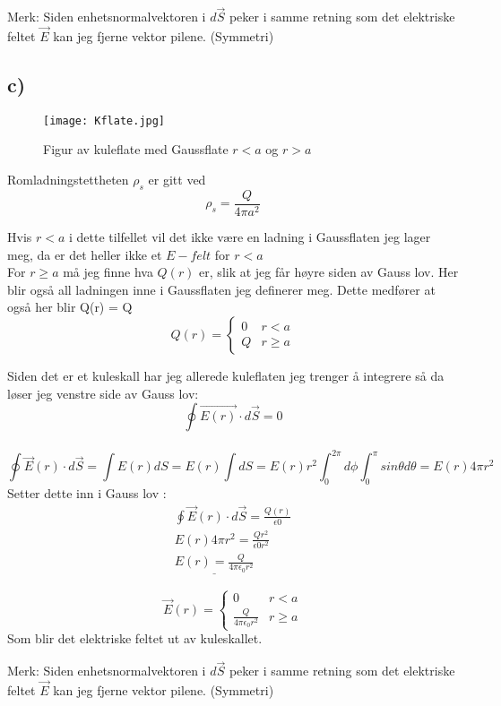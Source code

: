 \documentclass[a4paper,12pt,norsk]{article}
\begin{document}
Merk: Siden enhetsnormalvektoren i $d\vec{S}$ peker i samme retning som det elektriske feltet $\vec{E}$ kan jeg fjerne vektor pilene. (Symmetri)

\subsection{c)}
\begin{figure}[h!]
\texttt{[image: Kflate.jpg]} 
\caption{Figur av kuleflate med Gaussflate $r < a$ og $r>a$}
\label{4}
\end{figure} 

Romladningstettheten $\rho_s$ er gitt ved $$\rho_s = \frac{Q}{4\pi a^2}$$

Hvis $r<a$ i dette tilfellet vil det ikke være en ladning i Gaussflaten jeg lager meg, da er det heller ikke et $E-felt$ for $r<a$ \\
For $r \geq a$  må jeg finne hva $Q(r)$ er, slik at jeg får høyre siden av Gauss lov. Her blir også all ladningen inne i Gaussflaten jeg definerer meg. Dette medfører at også her blir Q(r) = Q
\[ Q(r) = \begin{cases}
 0 & r < a\\
 Q &  r \geq a
\end{cases}\]

Siden det er et kuleskall har jeg allerede kuleflaten jeg trenger å integrere så da løser jeg venstre side av Gauss lov:
$$ \oint \vec{E(r)} \cdot d\vec{S} = 0$$\\

$$\oint \vec{E}(r) \cdot d\vec{S} = \int E(r)dS = E(r)\int dS = E(r)r^2 \int_0^{2\pi}d\phi \int_0^\pi sin\theta d\theta  = E(r)4\pi r^2$$
Setter dette inn i Gauss lov :
\begin{align*}
\oint \vec{E}(r) \cdot d\vec{S} = \frac{Q(r)}{\epsilon0}\\
E(r)4\pi r^2 = \frac{Qr^2}{\epsilon0r^2} \\
\underline{E(r) = \frac{Q}{4\pi \epsilon_0 r^2}}
\end{align*}

\[ \vec{E}(r) = \begin{cases}
 0 & r < a\\
 \frac{Q}{4\pi \epsilon_0 r^2}&  r \geq a
\end{cases}\]
Som blir det elektriske feltet ut av kuleskallet. 

Merk: Siden enhetsnormalvektoren i $d\vec{S}$ peker i samme retning som det elektriske feltet $\vec{E}$ kan jeg fjerne vektor pilene. (Symmetri)
\end{document}
